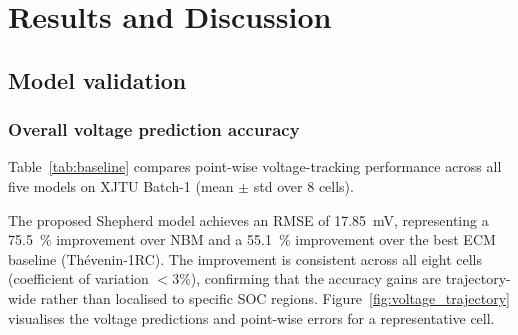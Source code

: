 \documentclass[5p,times,number]{elsarticle}
\newcommand{\figref}[1]{\hyperref[#1]{\textup{Figure~\ref*{#1}}}}
\newcommand{\tabref}[1]{\hyperref[#1]{\textup{Table~\ref*{#1}}}}
\def\figref#1{Figure~\ref{#1}}
\def\tabref#1{Table~\ref{#1}}
\begin{document}
\section{Results and Discussion}\label{sec:results}
\subsection{Model validation}\label{sec:validation}
\subsubsection{Overall voltage prediction accuracy}\label{sec:voltage}
\tabref{tab:baseline} compares point-wise voltage-tracking performance across all five models on XJTU Batch-1 (mean $\pm$ std over 8 cells).
\begin{table}[!tb]
\caption{Voltage prediction accuracy on XJTU Batch-1 (mean $\pm$ std, 8 cells).}\label{tab:baseline}
\centering
{}
\end{table}
The proposed Shepherd model achieves an RMSE of \SI{17.85}{\milli\volt}, representing a \SI{75.5}{\percent} improvement over NBM and a \SI{55.1}{\percent} improvement over the best ECM baseline (Th\'{e}venin-1RC).
The improvement is consistent across all eight cells (coefficient of variation $< 3\%$), confirming that the accuracy gains are trajectory-wide rather than localised to specific SOC regions.
\figref{fig:voltage_trajectory} visualises the voltage predictions and point-wise errors for a representative cell.
\end{document}
